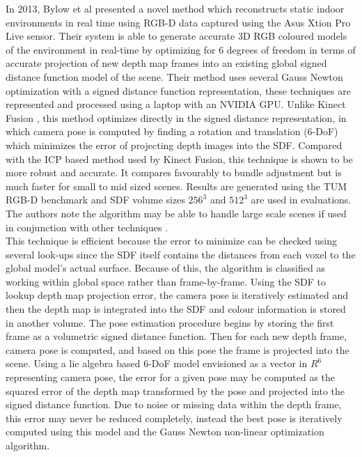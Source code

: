 In 2013, Bylow et al \cite{Bylow13Real} presented a novel method which reconstructs static indoor environments in real time using RGB-D data captured using the Asus Xtion Pro Live sensor. Their system is able to generate accurate 3D RGB coloured models of the environment in real-time by optimizing for 6 degrees of freedom in terms of accurate projection of new depth map frames into an existing global signed distance function model of the scene. Their method uses several Gauss Newton optimization with a signed distance function representation, these techniques are represented and processed using a laptop with an NVIDIA GPU. Unlike Kinect Fusion \cite{Newcombe11Kinectfusion}, this method optimizes directly in the signed distance representation, in which camera pose is computed by finding a rotation and translation (6-DoF) which minimizes the error of projecting depth images into the SDF. Compared with the ICP based method used by Kinect Fusion, this technique is shown to be more robust and accurate. It compares favourably to bundle adjustment but is much faster for small to mid sized scenes. Results are generated using the TUM RGB-D benchmark and SDF volume sizes $256^3$ and $512^3$ are used in evaluations. The authors note the algorithm may be able to handle large scale scenes if used in conjunction with other techniques \cite{Kaess11Isam2,Kummerle11G}. \\

This technique is efficient because the error to minimize can be checked using several look-ups since the SDF itself contains the distances from each voxel to the global model's actual surface. Because of this, the algorithm is classified as working within global space rather than frame-by-frame. Using the SDF to lookup depth map projection error, the camera pose is iteratively estimated and then the depth map is integrated into the SDF and colour information is stored in another volume. The pose estimation procedure begins by storing the first frame as a volumetric signed distance function. Then for each new depth frame, camera pose is computed, and based on this pose the frame is projected into the scene. Using a lie algebra based 6-DoF model \cite{Ma12Invitation} envisioned as a vector in $R^6$ representing camera pose, the error for a given pose may be computed as the squared error of the depth map transformed by the pose and projected into the signed distance function. Due to noise or missing data within the depth frame, this error may never be reduced completely, instead the best pose is iteratively computed using this model and the Gauss Newton non-linear optimization algorithm. \\

